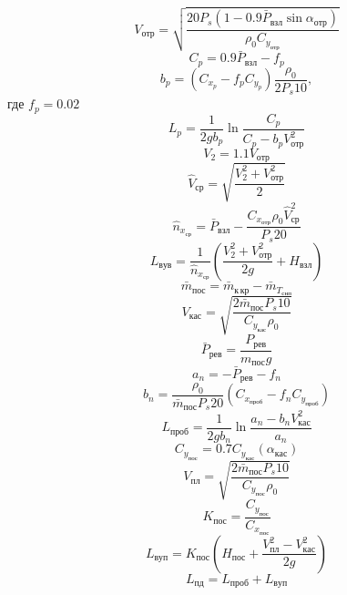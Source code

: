 \begin{equation}
    V_{отр} = \sqrt{\frac{20 P_s (1 - 0.9 \bar{P}_{взл} \sin{\alpha_{отр}})}
    {\rho_0 C_{y_{отр}}}}
\end{equation}
\begin{equation}
    C_p = 0.9 \bar{P}_{взл} - f_p
\end{equation}
\begin{equation}
    b_p = (C_{x_p} - f_p C_{y_p}) \frac{\rho_0}{2 P_s 10},
\end{equation}
где $f_p = 0.02$
\begin{equation}
    L_p = \frac{1}{2 g b_p} \ln{\frac{C_p}{C_p -  b_p V_{отр}^2}} 
\end{equation}
\begin{equation}
    V_2 = 1.1 V_{отр}
\end{equation}
\begin{equation}
    \hat{V}_{ср} = \sqrt{\frac{V_2^2 + V_{отр}^2}{2}}
\end{equation}
\begin{equation}
    \hat{n}_{x_{ср}} = \bar{P}_{взл} - \frac{C_{x_{отр}} \rho_0 \hat{V}_{ср}^2}
    {P_s 20}
\end{equation}
\begin{equation}
    L_{вув} = \frac{1}{\hat{n}_{x_{ср}}} \left( \frac{V_2^2 + V_{отр}^2}{2g} +
    H_{взл}\right) 
\end{equation}
\begin{equation}
    \bar{m}_{пос} = \bar{m}_{к\, кр} - \bar{m}_{T_{снп}}
\end{equation}
\begin{equation}
    V_{кас} = \sqrt{\frac{2 \bar{m}_{пос} P_s 10 }{ C_{y_{кас}} \rho_0 }}
\end{equation}
\begin{equation}
    \bar{P}_{рев} = \frac{P_{рев}}{m_{пос} g}
\end{equation}
\begin{equation}
    a_n = - \bar{P}_{рев} - f_n
\end{equation}
\begin{equation}
    b_n = \frac{\rho_0}{\bar{m}_{пос} P_s 20} (C_{x_{проб}} - f_n C_{y_{проб}})
\end{equation}
\begin{equation}
    L_{проб} = \frac{1}{2g b_n} \ln{\frac{a_n - b_n V_{кас}^2}{a_n}}
\end{equation}
\begin{equation}
    C_{y_{пос}} = 0.7 C_{y_{кас}}(\alpha_{кас})
\end{equation}
\begin{equation}
    V_{пл} = \sqrt{\frac{2 \bar{m}_{пос} P_s 10 }{C_{y_{пос}} \rho_0}}
\end{equation}
\begin{equation}
    K_{пос} = \frac{C_{y_{пос}}}{C_{x_{пос}}}
\end{equation}
\begin{equation}
    L_{вуп} = K_{пос} \left( H_{пос} + \frac{V_{пл}^2 - V_{кас}^2}{2g} \right) 
\end{equation}
\begin{equation}
    L_{пд} = L_{проб} + L_{вуп}
\end{equation}

